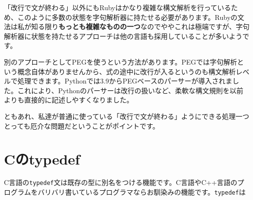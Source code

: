 \begin{Shaded}
\begin{Highlighting}[]
\NormalTok{\};}
\end{Highlighting}
\end{Shaded}

「改行で文が終わる」以外にもRubyはかなり複雑な構文解析を行っているため、このように多数の状態を字句解析器に持たせる必要があります。Rubyの文法は私が知る限り\textbf{もっとも複雑なものの一つ}なのでややこれは極端ですが、字句解析器に状態を持たせるアプローチは他の言語も採用していることが多いようです。

別のアプローチとしてPEGを使うという方法があります。PEGでは字句解析という概念自体がありませんから、式の途中に改行が入るというのも構文解析レベルで処理できます。Pythonでは3.9からPEGベースのパーサーが導入されました。これにより、Pythonのパーサーは改行の扱いなど、柔軟な構文規則を以前よりも直接的に記述しやすくなりました。

ともあれ、私達が普通に使っている「改行で文が終わる」ようにできる処理一つとっても厄介な問題だということがポイントです。

\hypertarget{chapter7-cux306etypedef}{%
\section{Cのtypedef}\label{chapter7-cux306etypedef}}

C言語の\texttt{typedef}文は既存の型に別名をつける機能です。C言語やC++言語のプログラムをバリバリ書いているプログラマならお馴染みの機能です。\texttt{typedef}は


